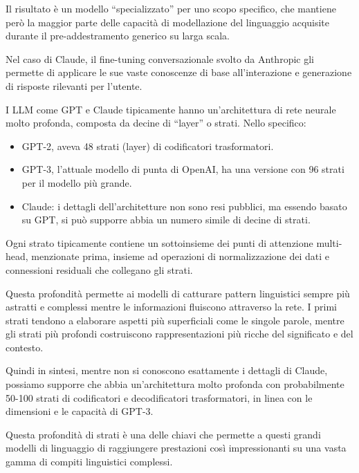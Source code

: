             Il risultato è un modello ``specializzato'' per uno scopo specifico, che mantiene però la maggior parte delle capacità di modellazione del linguaggio acquisite durante il pre-addestramento generico su larga scala.
            
            Nel caso di Claude, il fine-tuning conversazionale svolto da Anthropic gli permette di applicare le sue vaste conoscenze di base all'interazione e generazione di risposte rilevanti per l'utente.
            
            I LLM come GPT e Claude tipicamente hanno un'architettura di rete neurale molto profonda, composta da decine di ``layer'' o strati. Nello specifico:
            \begin{itemize}
                \item GPT-2, aveva 48 strati (layer) di codificatori trasformatori.
                
                \item GPT-3, l'attuale modello di punta di OpenAI, ha una versione con 96 strati per il modello più grande.
                
                \item Claude: i dettagli dell'architetture non sono resi pubblici, ma essendo basato su GPT, si può supporre abbia un numero simile di decine di strati.
            \end{itemize}
            
            Ogni strato tipicamente contiene un sottoinsieme dei punti di attenzione multi-head, menzionate prima, insieme ad operazioni di normalizzazione dei dati e connessioni residuali che collegano gli strati.
            
            Questa profondità permette ai modelli di catturare pattern linguistici sempre più astratti e complessi mentre le informazioni fluiscono attraverso la rete. I primi strati tendono a elaborare aspetti più superficiali come le singole parole, mentre gli strati più profondi costruiscono rappresentazioni più ricche del significato e del contesto.
            
            Quindi in sintesi, mentre non si conoscono esattamente i dettagli di Claude, possiamo supporre che abbia un'architettura molto profonda con probabilmente 50-100 strati di codificatori e decodificatori trasformatori, in linea con le dimensioni e le capacità di GPT-3.
            
            Questa profondità di strati è una delle chiavi che permette a questi grandi modelli di linguaggio di raggiungere prestazioni così impressionanti su una vasta gamma di compiti linguistici complessi.
            
